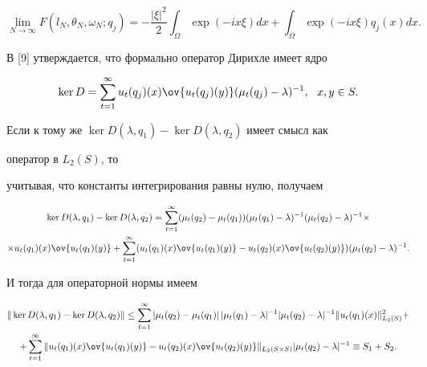 \begin{equation} 


\lim_{N\to\infty}F(l_N,\theta_N,\omega_N;q_j)= 


-\frac{|\xi|^2}{2}\int_\Omega\exp(-i x\xi)d x+ 


\int_\Omega\exp(-i x\xi)q_j(x)d x. 


\end{equation} 


 


В [9] утверждается, что формально оператор Дирихле имеет ядро 


$$ 


\ker D=\sum^\infty_{t=1}u_t(q_j)(x) 


\ov{u_t(q_j)(y)}(\mu_t(q_j)-\lambda)^{-1}, 


\ \ x,y\in S. 


$$ 


Если к тому же $\ker D(\lambda,q_1)-\ker D(\lambda,q_2)$ имеет смысл как 


оператор в $L_2(S)$, то 


учитывая, что константы интегрирования равны нулю, получаем 


\begin{multline*} 


\ker D(\lambda,q_1)-\ker D(\lambda,q_2)=\sum^\infty_{t=1} 


(\mu_t(q_2)-\mu_t(q_1))(\mu_t(q_1)-\lambda)^{-1}


(\mu_t(q_2)-\lambda)^{-1}\times \\ 


% 


\times u_t(q_1)(x)\ov{u_t(q_1)(y)}+\sum^\infty_{t=1} 


(u_t(q_1)(x)\ov{u_t(q_1)(y)}-u_t(q_2)(x) 


\ov{u_t(q_2)(y)})(\mu_t(q_2)-\lambda)^{-1}. 


\end{multline*} 


И тогда для операторной нормы имеем 


\begin{multline} 


\|\ker D(\lambda,q_1)-\ker D(\lambda,q_2)\|\le\sum^\infty_{t=1} 


|\mu_t(q_2)-\mu_t(q_1)|\,|\mu_t(q_1)-\lambda|^{-1} 


|\mu_t(q_2)-\lambda|^{-1}\|u_t(q_1)(x)\|^2_{L_2(S)}+ \\ 


% 


+\sum^\infty_{t=1} 


\|u_t(q_1)(x)\ov{u_t(q_1)(y)}-u_t(q_2)(x) 


\ov{u_t(q_2)(y)}\|_{L_2(S\times S)} 


|\mu_t(q_2)-\lambda|^{-1}\equiv S_1+S_2. 


\end{multline} 


